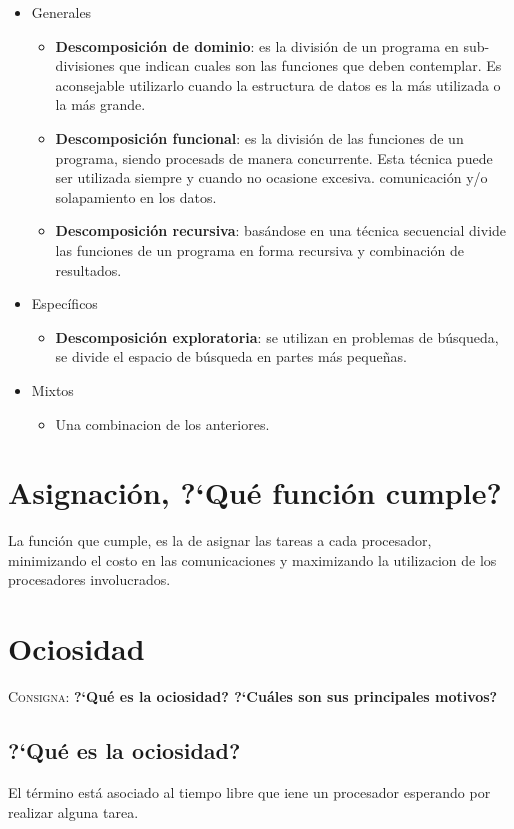 \documentclass{article}
\begin{document}
\begin{itemize}
\item Generales
	\begin{itemize}
	\item \textbf{Descomposici\'on de dominio}: es la divisi\'on de un
programa en sub-divisiones que indican cuales son las funciones que deben
contemplar. Es aconsejable utilizarlo cuando la estructura de datos es la m\'as
utilizada o la m\'as grande.
	\item \textbf{Descomposici\'on funcional}: es la divisi\'on de las
funciones de un programa, siendo procesads de manera concurrente. Esta
t\'ecnica puede ser utilizada siempre y cuando no ocasione excesiva.
comunicaci\'on y/o solapamiento en los datos.
	\item \textbf{Descomposici\'on recursiva}: bas\'andose en una t\'ecnica
secuencial divide las funciones de un programa en forma recursiva y
combinaci\'on de resultados.
	\end{itemize}
\item Espec\'ificos
	\begin{itemize}
	\item \textbf{Descomposici\'on exploratoria}: se utilizan en problemas
de b\'usqueda, se divide el espacio de b\'usqueda en partes m\'as peque\~nas.
	\end{itemize}
\item Mixtos
	\begin{itemize}
	\item Una combinacion de los anteriores.
	\end{itemize}
\end{itemize}

\section{Asignaci\'on, ?`Qu\'e funci\'on cumple?}
La funci\'on que cumple, es la de asignar las tareas a cada procesador,
minimizando el costo en las comunicaciones y maximizando la utilizacion de los
procesadores involucrados.

\section{Ociosidad}
\textsc{Consigna}: \textbf{?`Qu\'e es la ociosidad? ?`Cu\'ales son sus principales motivos?}
\subsection{?`Qu\'e es la ociosidad?}
El t\'ermino est\'a asociado al tiempo libre que iene un procesador esperando
por realizar alguna tarea.
\end{document}

